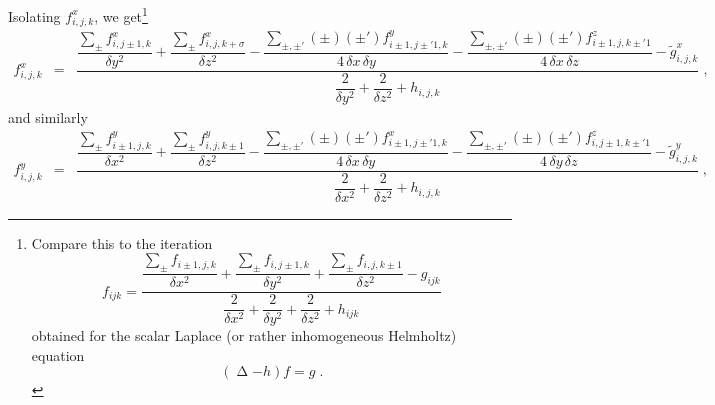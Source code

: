 \documentclass[\mydriver,12pt,twoside,notitlepage,letterpaper]{article}
\newcommand{\Laplace} { \mathop{\Delta}\nolimits}
\begin{document}
Isolating $f^{x}_{i,j,k}$, we get\footnote{
  Compare this to the iteration
  \begin{equation}
    f_{ijk}
    = \dfrac{\dfrac{\sum\limits_{\pm}
                      f_{i\pm1,j,k}}
                   {\delta x^2}
             +
             \dfrac{\sum\limits_{\pm}
                      f_{i,j\pm1,k}}
                   {\delta y^2}
             +
             \dfrac{\sum\limits_{\pm}
                      f_{i,j,k\pm1}}
                   {\delta z^2}
             - g_{ijk}
            }
            {\dfrac{2}{\delta x^2}
             + \dfrac{2}{\delta y^2}
             + \dfrac{2}{\delta z^2}
             + h_{ijk}
            }
  \end{equation}
  obtained for the scalar Laplace (or rather inhomogeneous Helmholtz)
  equation
  \begin{equation}
    (\Laplace - h) f = g \; .
  \end{equation}
}
\begin{eqnarray}
  f^{x}_{i,j,k}
  &=& \dfrac{\dfrac{\sum\limits_{\pm}
                      f^{x}_{i,j\pm1,k}}
                   {\delta y^2}
             +
             \dfrac{\sum\limits_{\pm}
                      f^{x}_{i,j,k+\sigma}}
                   {\delta z^2}
             -
             \dfrac{\sum\limits_{\pm,\pm'}
                      (\pm) (\pm') f^{y}_{i\pm1,j\pm'1,k}}
                   {4\,\delta x\,\delta y}
             -
             \dfrac{\sum\limits_{\pm,\pm'}
                      (\pm) (\pm') f^{z}_{i\pm1,j,k\pm'1}}
                   {4\,\delta x\,\delta z}
             - \tilde{g}^{x}_{i,j,k}
            }
            {\dfrac{2}{\delta y^2} + \dfrac{2}{\delta z^2} + h_{i,j,k}} \; ,
\end{eqnarray}
and similarly
\begin{eqnarray}
  f^{y}_{i,j,k}
  &=& \dfrac{\dfrac{\sum\limits_{\pm}
                      f^{y}_{i\pm1,j,k}}
                   {\delta x^2}
             +
             \dfrac{\sum\limits_{\pm}
                      f^{y}_{i,j,k\pm1}}
                   {\delta z^2}
             -
             \dfrac{\sum\limits_{\pm,\pm'}
                      (\pm) (\pm') f^{x}_{i\pm1,j\pm'1,k}}
                   {4\,\delta x\,\delta y}
             -
             \dfrac{\sum\limits_{\pm,\pm'}
                      (\pm) (\pm') f^{z}_{i,j\pm1,k\pm'1}}
                   {4\,\delta y\,\delta z}
             - \tilde{g}^{y}_{i,j,k}
            }
            {\dfrac{2}{\delta x^2} + \dfrac{2}{\delta z^2} + h_{i,j,k}} \; ,
\end{eqnarray}
\end{document}
